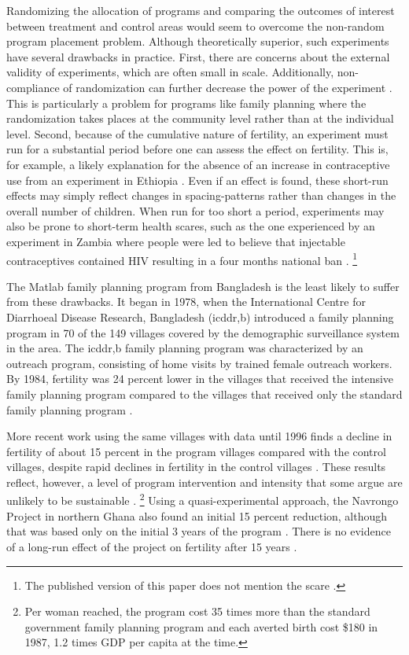 \documentclass[letterpaper,12pt]{article}
\begin{document}
Randomizing the allocation of programs and comparing the outcomes of
interest between treatment and control areas would seem to overcome the
non-random program placement problem. 
Although theoretically superior, such experiments have several drawbacks
in practice. 
First, there are concerns about the external validity of experiments,
which are often small in scale. 
Additionally, non-compliance of randomization can further decrease the
power of the experiment \citep{Desai2011}. 
This is particularly a problem for programs like family planning where
the randomization takes places at the community level rather than at the
individual level. 
Second, because of the cumulative nature of fertility, an experiment
must run for a substantial period before one can assess the effect on
fertility. 
This is, for example, a likely explanation for the absence of an
increase in contraceptive use from an experiment in Ethiopia
\citep{Desai2011}. 
Even if an effect is found, these short-run effects may simply reflect
changes in spacing-patterns rather than changes in the overall number of
children. 
When run for too short a period, experiments may also be prone to
short-term health scares, such as the one experienced by an experiment
in Zambia where people were led to believe that injectable
contraceptives contained HIV resulting in a four months national ban
\citep{Ashraf2009}.%
\footnote{
The published version of this paper does not mention the scare
\citep{Ashraf2014}.}

The Matlab family planning program from Bangladesh is the least likely
to suffer from these drawbacks. 
It began in 1978, when the International Centre for Diarrhoeal Disease
Research, Bangladesh (icddr,b) introduced a family planning program in
70 of the 149 villages covered by the demographic surveillance system in
the area. 
The icddr,b family planning program was characterized by an outreach
program, consisting of home visits by trained female outreach workers. 
By 1984, fertility was 24 percent lower in the villages that received
the intensive family planning program compared to the villages that
received only the standard family planning program \citep{Phillips1988}.

More recent work using the same villages with data until 1996 finds a
decline in fertility of about 15 percent in the program villages
compared with the control villages, despite rapid declines in fertility
in the control villages \citep{Sinha2005,Joshi2007}. 
These results reflect, however, a level of program intervention and
intensity that some argue are unlikely to be sustainable
\citep{pritchett94a}.%
\footnote{
Per woman reached, the program cost 35 times more than the standard
government family planning program and each averted birth cost \$180 in
1987, 1.2 times GDP per capita at the time.} 
Using a quasi-experimental approach, the Navrongo Project in northern
Ghana also found an initial 15 percent reduction, although that was
based only on the initial 3 years of the program \citep{Debpuur2002}. 
There is no evidence of a long-run effect of the project on fertility
after 15 years \citep{Phillips2012}.
\end{document}
